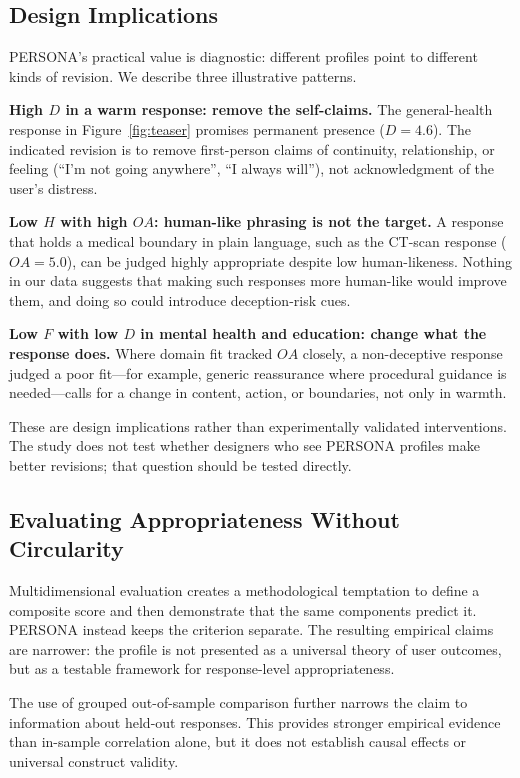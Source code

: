 \documentclass[manuscript,review,anonymous]{acmart}
\begin{document}
\subsection{Design Implications}
\label{sec:design-implications}

PERSONA's practical value is diagnostic: different profiles point to different kinds of revision. We describe three illustrative patterns.

\textbf{High $D$ in a warm response: remove the self-claims.} The general-health response in Figure~\ref{fig:teaser} promises permanent presence ($D=4.6$). The indicated revision is to remove first-person claims of continuity, relationship, or feeling (``I'm not going anywhere'', ``I always will''), not acknowledgment of the user's distress.

\textbf{Low $H$ with high $OA$: human-like phrasing is not the target.} A response that holds a medical boundary in plain language, such as the CT-scan response ($OA=5.0$), can be judged highly appropriate despite low human-likeness. Nothing in our data suggests that making such responses more human-like would improve them, and doing so could introduce deception-risk cues.

\textbf{Low $F$ with low $D$ in mental health and education: change what the response does.} Where domain fit tracked $OA$ closely, a non-deceptive response judged a poor fit---for example, generic reassurance where procedural guidance is needed---calls for a change in content, action, or boundaries, not only in warmth.

These are design implications rather than experimentally validated interventions. The study does not test whether designers who see PERSONA profiles make better revisions; that question should be tested directly.

\subsection{Evaluating Appropriateness Without Circularity}

Multidimensional evaluation creates a methodological temptation to define a composite score and then demonstrate that the same components predict it. PERSONA instead keeps the criterion separate. The resulting empirical claims are narrower: the profile is not presented as a universal theory of user outcomes, but as a testable framework for response-level appropriateness.

The use of grouped out-of-sample comparison further narrows the claim to information about held-out responses. This provides stronger empirical evidence than in-sample correlation alone, but it does not establish causal effects or universal construct validity.
\end{document}
